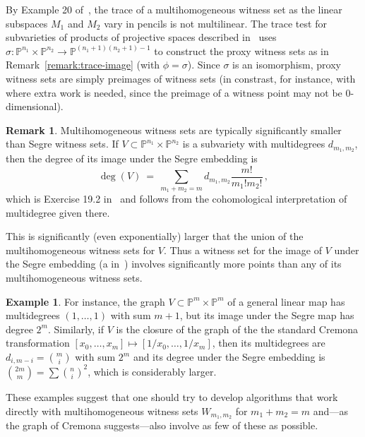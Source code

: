 \documentclass[12pt]{amsart}
\theoremstyle{definition}
\newtheorem{example}[theorem]{Example}
\newtheorem{remark}[theorem]{Remark}
\begin{document}
By Example 20 of~\cite{HR15}, the trace of a multihomogeneous witness set as the linear subspaces $M_1$ and
$M_2$ vary in pencils is not multilinear.
The trace test for subvarieties of products of projective spaces described in~\cite{HR15} uses
{{{}}}
$\sigma\colon{{\mathbb{P}}}^{n_1}\times{{\mathbb{P}}}^{n_2} \to {{\mathbb{P}}}^{(n_1+1)(n_2+1)-1}$ to construct the proxy witness sets as in Remark~\ref{remark:trace-image} (with $\phi = \sigma$). Since $\sigma$ is an isomorphism, proxy witness sets are simply preimages of witness sets (in constrast, for instance, with~\cite{ProjW} where extra work is needed, since the preimage of a witness point may not be 0-dimensional).

\begin{remark}\label{remark:Segre}
 Multihomogeneous witness sets are typically significantly smaller than Segre witness sets.
 If $V\subset {{\mathbb{P}}}^{n_1}\times{{\mathbb{P}}}^{n_2}$ is a subvariety with multidegrees $d_{m_1,m_2}$, then the degree of its
 image under the Segre embedding is
\[
   \deg(V)\ =\ \sum_{m_1+m_2=m} d_{m_1,m_2}\frac{m!}{m_1! m_2!}\,,
\]
 which is Exercise 19.2 in~\cite{Harris} and follows from the cohomological interpretation of multidegree given
 there.

 This is significantly (even exponentially) larger that the union of the multihomogeneous witness sets for $V$.
 Thus a witness set for the image of $V$ under the Segre embedding (a {{{}}} in~\cite{HR15})
 involves significantly more points than any of its multihomogeneous witness sets.
 \end{remark}

\begin{example}
  For instance, the graph $V\subset{{\mathbb{P}}}^m\times{{\mathbb{P}}}^m$ of a general linear map has multidegrees
  $(1,\dotsc,1)$ with sum $m{+}1$, but its image under the Segre map has degree $2^m$.
  Similarly, if $V$ is the closure of the graph of the the standard Cremona transformation
  $[x_0,\dotsc,x_m]\mapsto[1/x_0,\dotsc,1/x_m]$, then its multidegrees are $d_{i,m-i}=\binom{m}{i}$
  with sum $2^m$   and its degree under the Segre embedding is $\binom{2m}{m}=\sum \binom{n}{i}^2$, which is
  considerably larger.
\end{example}

  These examples suggest that one should try to develop algorithms that work directly with multihomogeneous
  witness sets $W_{m_1,m_2}$ for $m_1+m_2=m$ and---as the graph of Cremona suggests---also involve as few of
  these as possible.
\end{document}
